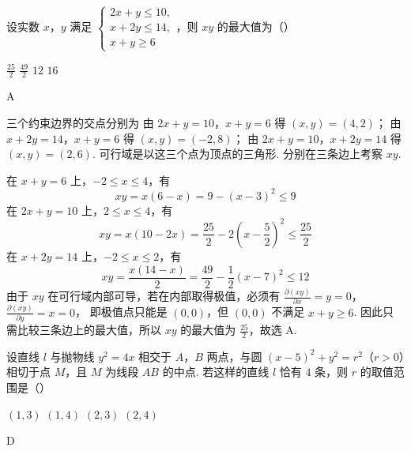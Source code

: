 \begin{problem}
设实数 \(x\)，\(y\) 满足 \(\begin{cases}
2x + y \leqslant 10,\\
x + 2y \leqslant 14,\\
x + y \geqslant 6
\end{cases}\)，则 \(xy\) 的最大值为（\quad）

\choices
    {\(\frac{25}{2}\)}
    {\(\frac{49}{2}\)}
    {\(12\)}
    {\(16\)}
\end{problem}

\begin{answer}
A
\end{answer}

\begin{solution}
三个约束边界的交点分别为
由 \(2x+y=10\)，\(x+y=6\) 得 \((x,y)=(4,2)\)；
由 \(x+2y=14\)，\(x+y=6\) 得 \((x,y)=(-2,8)\)；
由 \(2x+y=10\)，\(x+2y=14\) 得 \((x,y)=(2,6)\).
可行域是以这三个点为顶点的三角形. 分别在三条边上考察 \(xy\).

在 \(x+y=6\) 上，\(-2\leqslant x\leqslant4\)，有
\[
xy=x(6-x)=9-(x-3)^2\leqslant9
\]
在 \(2x+y=10\) 上，\(2\leqslant x\leqslant4\)，有
\[
xy=x(10-2x)=\frac{25}{2}-2\left(x-\frac52\right)^2\leqslant\frac{25}{2}
\]
在 \(x+2y=14\) 上，\(-2\leqslant x\leqslant2\)，有
\[
xy=\frac{x(14-x)}2=\frac{49}{2}-\frac12(x-7)^2\leqslant12
\]
由于 \(xy\) 在可行域内部可导，若在内部取得极值，必须有
\(\frac{\partial(xy)}{\partial x}=y=0\)，\(\frac{\partial(xy)}{\partial y}=x=0\)，
即极值点只能是 \((0,0)\)，但 \((0,0)\) 不满足 \(x+y\geqslant6\). 因此只需比较三条边上的最大值，所以 \(xy\) 的最大值为 \(\frac{25}{2}\)，故选 A.
\end{solution}

\begin{problem}
设直线 \(l\) 与抛物线 \(y^{2} = 4x\) 相交于 \(A\)，\(B\) 两点，与圆 \((x - 5)^{2} + y^{2} = r^{2}\)（\(r > 0\)）相切于点 \(M\)，且 \(M\) 为线段 \(AB\) 的中点. 若这样的直线 \(l\) 恰有 \(4\) 条，则 \(r\) 的取值范围是（\quad）

\choices
    {\((1, 3)\)}
    {\((1, 4)\)}
    {\((2, 3)\)}
    {\((2, 4)\)}
\end{problem}

\begin{answer}
D
\end{answer}

